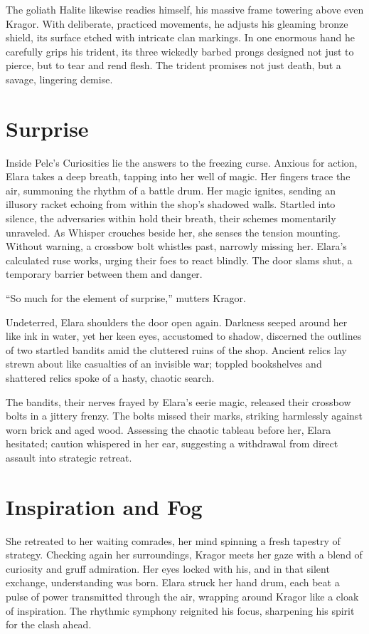 \documentclass[
  letterpaper,12pt,twoside,twocolumn,openany,
  nodeprecatedcode,bg=full]{dndbook}
\begin{document}
The goliath Halite likewise readies himself, his massive frame towering
above even Kragor. With deliberate, practiced movements, he adjusts his
gleaming bronze shield, its surface etched with intricate clan markings.
In one enormous hand he carefully grips his trident, its three wickedly
barbed prongs designed not just to pierce, but to tear and rend flesh.
The trident promises not just death, but a savage, lingering demise.

\section{Surprise}\label{surprise}

Inside Pelc's Curiosities lie the answers to the freezing curse. Anxious
for action, Elara takes a deep breath, tapping into her well of magic.
Her fingers trace the air, summoning the rhythm of a battle drum. Her
magic ignites, sending an illusory racket echoing from within the shop's
shadowed walls. Startled into silence, the adversaries within hold their
breath, their schemes momentarily unraveled. As Whisper crouches beside
her, she senses the tension mounting. Without warning, a crossbow bolt
whistles past, narrowly missing her. Elara's calculated ruse works,
urging their foes to react blindly. The door slams shut, a temporary
barrier between them and danger.

``So much for the element of surprise,'' mutters Kragor.

Undeterred, Elara shoulders the door open again. Darkness seeped around
her like ink in water, yet her keen eyes, accustomed to shadow,
discerned the outlines of two startled bandits amid the cluttered ruins
of the shop. Ancient relics lay strewn about like casualties of an
invisible war; toppled bookshelves and shattered relics spoke of a
hasty, chaotic search.

The bandits, their nerves frayed by Elara's eerie magic, released their
crossbow bolts in a jittery frenzy. The bolts missed their marks,
striking harmlessly against worn brick and aged wood. Assessing the
chaotic tableau before her, Elara hesitated; caution whispered in her
ear, suggesting a withdrawal from direct assault into strategic retreat.

\section{Inspiration and Fog}\label{inspiration-and-fog}

She retreated to her waiting comrades, her mind spinning a fresh
tapestry of strategy. Checking again her surroundings, Kragor meets her
gaze with a blend of curiosity and gruff admiration. Her eyes locked
with his, and in that silent exchange, understanding was born. Elara
struck her hand drum, each beat a pulse of power transmitted through the
air, wrapping around Kragor like a cloak of inspiration. The rhythmic
symphony reignited his focus, sharpening his spirit for the clash ahead.
\end{document}
